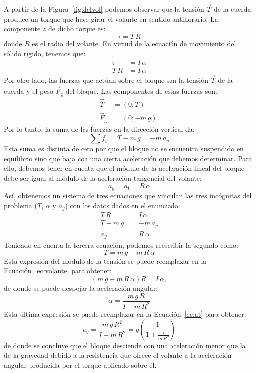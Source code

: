 \documentclass[addpoints]{exam}
\begin{document}
\begin{questions}
\begin{solution}
    A partir de la Figura~\ref{fig:dclvol} podemos observar que la tensión $\vec{T}$ de la cuerda produce un torque que hace girar el volante en sentido antihorario. La componente $z$ de dicho torque es: $$\tau = T \, R$$ donde $R$ es el radio del volante. En virtud de la ecuación de movimiento del sólido rígido, tenemos que:
    \begin{equation*}
        \begin{split}
            \tau &= I \, \alpha \\
        T \, R &= I \, \alpha
        \end{split}
    \end{equation*} Por otro lado, las fuerzas que actúan sobre el bloque son la tensión $\vec{T}$ de la cuerda y el peso $\vec{F}_\text{g}$ del bloque. Las componentes de estas fuerzas son:
    \begin{align*}
        \vec{T} &= \left(0;T\right) \\
        \vec{F}_\text{g} &= \left(0;-m \, g\right).
    \end{align*} Por lo tanto, la suma de las fuerzas en la dirección vertical da: $$\sum f_y = T - m \, g = - m \, a_y$$ Esta suma es distinta de cero por que el bloque no se encuentra suspendido en equilibrio sino que baja con una cierta aceleración que debemos determinar. Para ello, debemos tener en cuenta que el módulo de la aceleración lineal del bloque debe ser igual al módulo de la aceleración tangencial del volante: $$a_y = a_\text{t} = R \, \alpha$$ Así, obtenemos un sistema de tres ecuaciones que vinculan las tres incógnitas del problema ($T$, $\alpha$ y $a_y$) con los datos dados en el enunciado:
    \begin{align}
        T \, R &= I \, \alpha \label{ec:volante} \\
        T - m \, g &= - m \, a_y  \label{ec:bloque} \\
        a_y &= R \, \alpha  \label{ec:at}
    \end{align} Teniendo en cuenta la tercera ecuación, podemos reescribir la segundo como: $$T = m \, g - m \, R \, \alpha $$ Esta expresión del módulo de la tensión se puede reemplazar en la Ecuación~\eqref{ec:volante} para obtener: $$\left(m \, g - m \, R \, \alpha\right) R = I \, \alpha ,$$ de donde se puede despejar la aceleración angular: $$\alpha = \frac{m \, g \, R}{I + m \, R^2}$$ Esta última expresión se puede reemplazar en la Ecuación~\eqref{ec:at} para obtener: $$a_y = \frac{m \, g \, R^2}{I + m \, R^2} = g \left(\frac{1}{1 + \frac{I}{m \, R^2}}\right)$$ de donde se concluye que el bloque desciende con una aceleración menor que la de la gravedad debido a la resistencia que ofrece el volante a la aceleración angular producida por el torque aplicado sobre él.


\end{solution}
\end{questions}
\end{document}
